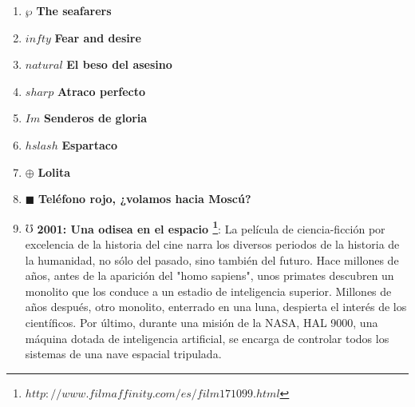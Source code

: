 \documentclass[12pt,a4paper]{article}
\begin{document}
\begin{enumerate}
\item $\wp$ \textbf{The seafarers}

\item $infty$ \textbf{Fear and desire}

\item $natural$ \textbf{El beso del asesino}

\item $sharp$ \textbf{Atraco perfecto}

\item $Im$ \textbf{Senderos de gloria}

\item $hslash$ \textbf{Espartaco}

\item $\oplus$ \textbf{Lolita}

\item $\blacksquare$ \textbf{Teléfono rojo, ¿volamos hacia Moscú?}

\item $\mho$ \textbf{2001: Una odisea en el espacio \footnote{$http://www.filmaffinity.com/es/film171099.html$}}: La película de ciencia-ficción por excelencia de la historia del cine narra los diversos periodos de la historia de la humanidad, no sólo del pasado, sino también del futuro. Hace millones de años, antes de la aparición del "homo sapiens", unos primates descubren un monolito que los conduce a un estadio de inteligencia superior. Millones de años después, otro monolito, enterrado en una luna, despierta el interés de los científicos. Por último, durante una misión de la NASA, HAL 9000, una máquina dotada de inteligencia artificial, se encarga de controlar todos los sistemas de una nave espacial tripulada.


\end{enumerate}
\end{document}
